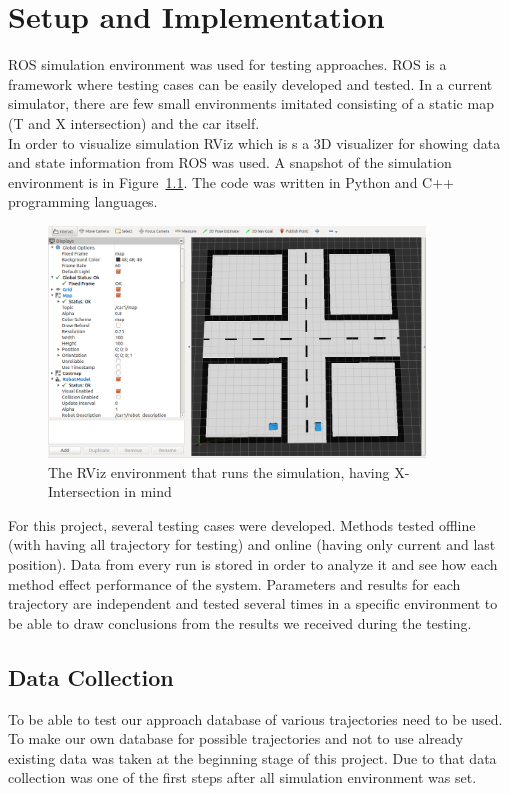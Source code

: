 \chapter{Setup and Implementation}
\label{chap:3}
%
\gls{ROS} simulation environment was used for testing approaches. \gls{ROS} is a framework where testing cases can be easily developed and tested. In a current simulator, there are few small environments imitated consisting of a static map (T and X intersection) and the car itself. \\
In order to visualize simulation \gls{RViz} which is s a 3D visualizer for showing data and state information from \gls{ROS} was used. A snapshot of the simulation environment is in Figure~\ref{fig:ROS1}. The code was written in Python and C++ programming languages.

\begin{figure}[h]
	\centering  	
	\includegraphics[width=10cm]{img/Ros.jpg}
	\caption{The \gls{RViz} environment that runs the simulation, having X-Intersection in mind}
	\label{fig:ROS1}    
\end{figure}

For this project, several testing cases were developed. Methods tested offline (with having all trajectory for testing) and online (having only current and last position). Data from every run is stored in order to analyze it and see how each method effect performance of the system.
Parameters and results for each trajectory are independent and tested several times in a specific environment to be able to draw conclusions from the results we received during the testing.

\section{Data Collection}

To be able to test our approach database of various trajectories need to be used. To make our own database for possible trajectories and not to use already existing data was taken at the beginning stage of this project. Due to that data collection was one of the first steps after all simulation environment was set. \\


